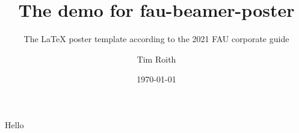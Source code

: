 \documentclass[final, 12pt]{beamer}
\title[fau-beamer]{The demo for fau-beamer-poster}
\subtitle{The \LaTeX{} poster template according to the 2021 FAU corporate guide}
\author[T. Roith]{Tim Roith}
\institute[FAU]{Friedrich-Alexander Universität Erlangen-Nürnberg, Department Mathematik}
\date{\today}
\begin{document}
\begin{frame}{Hello}{}
\end{frame}
\end{document}
